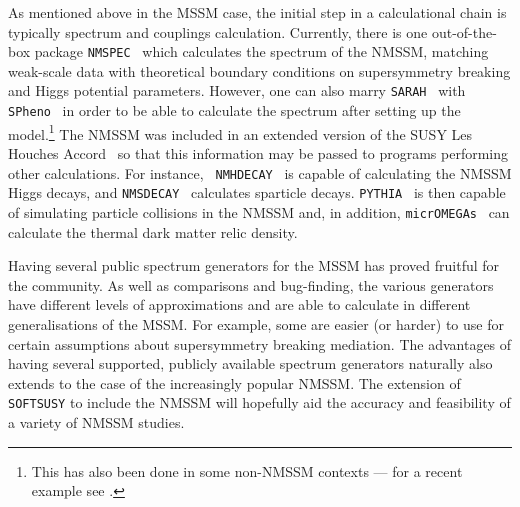 \documentclass[final,3p,times]{elsarticle}
\def\code#1{\small{\tt #1}\normalsize}
\begin{document}
As mentioned above in the MSSM case, the initial step in a calculational
chain is 
typically spectrum and couplings calculation. Currently, there is one
out-of-the-box package {\tt NMSPEC}~\cite{Ellwanger:2006rn} which calculates
the spectrum of the 
NMSSM, matching weak-scale data with theoretical boundary conditions on
supersymmetry breaking and Higgs potential parameters. However, one can also 
marry {\tt SARAH}~\cite{Staub:2009bi,Staub:2010jh,Staub:2012pb,Staub:2013tta} with {\tt
  SPheno}~\cite{Porod:2003um} in order to be 
able to 
calculate the spectrum after setting up the model.\footnote{This has also been done in some non-NMSSM contexts --- for a recent example see \cite{Bharucha:2013ela}.} The NMSSM was included in
an extended version of the SUSY Les Houches Accord~\cite{Allanach:2008qq} so
that this 
information may be passed to programs performing other calculations. For
instance, 
{\tt
  NMHDECAY}~\cite{Ellwanger:2005dv} is 
capable of calculating the NMSSM Higgs decays, and
{\tt NMSDECAY}~\cite{Muhlleitner:2003vg,Das:2011dg} calculates sparticle
decays. \code{PYTHIA}~\cite{Sjostrand:2007gs} is then capable of simulating
particle collisions in the NMSSM and, in addition, \code{micrOMEGAs}~\cite{Belanger:2008sj}
can calculate the thermal dark matter relic density.

Having several public spectrum generators for the MSSM has proved fruitful for
the community. As well as comparisons and bug-finding, the various generators
have different levels of approximations and are able to calculate in different
generalisations of the MSSM. For example, some are easier (or harder) to use for certain
assumptions about supersymmetry breaking mediation. 
The advantages of having
several supported, publicly available spectrum generators naturally also
extends to the 
case of the increasingly popular NMSSM.
The extension of {\tt SOFTSUSY} to include the
NMSSM will hopefully aid the
accuracy and feasibility of a variety of NMSSM studies. 
\end{document}
